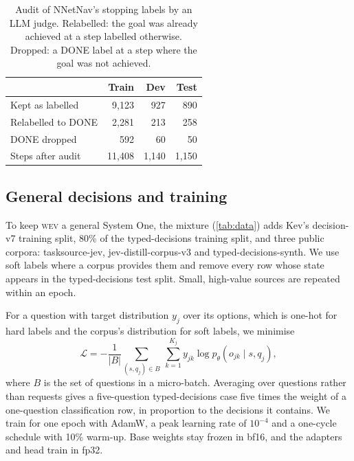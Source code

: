 \documentclass{article}
\newcommand{\wev}{\textsc{wev}\xspace}
\begin{document}
\begin{table}[t]
\centering
\caption{Audit of NNetNav's stopping labels by an LLM judge. Relabelled: the goal was already achieved at a step
labelled otherwise. Dropped: a DONE label at a step where the goal was not achieved.}
\label{tab:audit}
\begin{tabular}{lrrr}
\toprule
 & Train & Dev & Test \\
\midrule
Kept as labelled & 9{,}123 & 927 & 890 \\
Relabelled to DONE & 2{,}281 & 213 & 258 \\
DONE dropped & 592 & 60 & 50 \\
\midrule
Steps after audit & 11{,}408 & 1{,}140 & 1{,}150 \\
\bottomrule
\end{tabular}
\end{table}

\subsection{General decisions and training}
\label{sec:training}

To keep \wev a general System One, the mixture (\cref{tab:data}) adds Kev's decision-v7 training split, 80\% of the
typed-decisions training split, and three public corpora: tasksource-jev, jev-distill-corpus-v3 and
typed-decisions-synth. We use soft labels where a corpus provides them and remove every row whose state appears in the
typed-decisions test split. Small, high-value sources are repeated within an epoch.

For a question with target distribution $y_j$ over its options, which is one-hot for hard labels and the corpus's
distribution for soft labels, we minimise
\begin{equation}
  \mathcal{L} = -\frac{1}{|B|}\sum_{(s,q_j)\in B}\ \sum_{k=1}^{K_j} y_{jk}\log p_\theta(o_{jk}\mid s,q_j),
  \label{eq:loss}
\end{equation}
where $B$ is the set of questions in a micro-batch. Averaging over questions rather than requests gives a five-question
typed-decisions case five times the weight of a one-question classification row, in proportion to the decisions it
contains. We train for one epoch with AdamW, a peak learning rate of $10^{-4}$ and a one-cycle schedule with 10\%
warm-up. Base weights stay frozen in bf16, and the adapters and head train in fp32.
\end{document}
